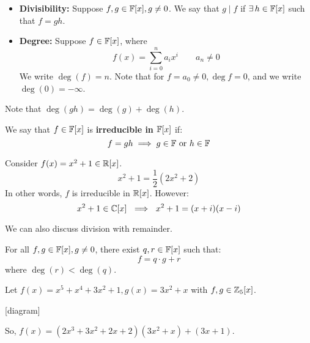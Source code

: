 \documentclass{article}
\begin{document}
\begin{crll}
    \begin{itemize}
        \item \textbf{Divisibility:} Suppose $ f, g \in \mathbb{F}[x], g \neq 0 $.
            We say that $ g \mid f $ if $ \exists \, h \in \mathbb{F}[x] $ such that $ f = gh $.
        \item \textbf{Degree:} Suppose $ f \in \mathbb{F}[x] $, where
            \begin{equation*}
                f(x) =  \sum_{i=0}^{n} a_{i}x^{i} \qquad a_{n} \neq 0
            \end{equation*}
            We write $ \deg(f) = n $. Note that for $ f = a_{0} \neq 0, \deg{f} = 0 $,
            and we write $ \deg(0) = -\infty $.
    \end{itemize}
\end{crll}

Note that $ \deg(gh) = \deg(g) + \deg(h) $.

\begin{defn}
    We say that $ f \in \mathbb{F}[x] $ is \textbf{irreducible in} $ \mathbb{F}[x] $ if:
    \begin{equation*}
        f = gh \implies g \in \mathbb{F} \textrm{ or } h \in \mathbb{F}
    \end{equation*}
\end{defn}

\begin{xmp}[source=Primary Source Material]
    Consider $ f(x) = x^{2} + 1 \in \mathbb{R}[x] $.
    \begin{equation*}
        x^{2} + 1 = \frac{1}{2}(2x^{2}+2)
    \end{equation*}
    In other words, $ f $ is irreducible in $ \mathbb{R}[x] $. However:
    \begin{equation*}
        x^{2} + 1 \in \mathbb{C}[x] \ \implies \ x^{2} + 1 = (x + i)(x - i)
    \end{equation*}
\end{xmp}

We can also discuss division with remainder.

\begin{lm}
    For all $ f, g \in \mathbb{F}[x], g \neq 0 $, there exist $ q, r \in \mathbb{F}[x] $ such that:
    \begin{equation*}
        f = q\cdot g + r
    \end{equation*}
    where $ \deg(r) < \deg(q) $.
\end{lm}

\begin{xmp}[source=Primary Source Material]
    Let $ f(x) = x^{5} + x^{4} + 3x^{2} + 1, g(x) = 3x^{2} + x $ with $ f, g \in \mathbb{Z}_{5}[x] $.

    [diagram]

    So, $ f(x) = (2x^{3} + 3x^{2} + 2x + 2)(3x^{2} + x) + (3x + 1) $.
\end{xmp}
\end{document}
